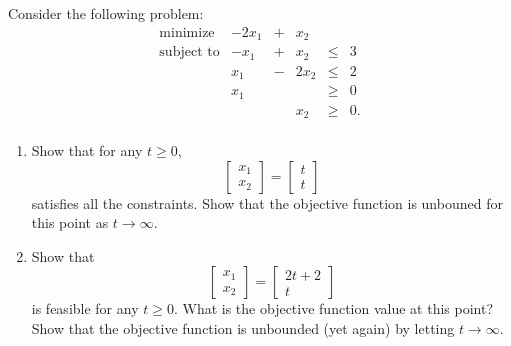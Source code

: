 \begin{ex}{}{} Consider the following problem:
\[
\begin{array}{rrcrll}
\mbox{minimize } & -2x_1 & + & x_2 & \\
\mbox{subject to} & -x_1 & + & x_2 & \leq & 3 \\
& x_1 & - & 2x_2 & \leq & 2 \\
& x_1 & & & \geq & 0 \\
& & & x_2 & \geq & 0. \\
\end{array}
\]

\begin{enumerate}
\item Show that for any \(t \geq 0\),
\[
\begin{bmatrix} x_1 \\ x_2 \end{bmatrix} = \begin{bmatrix} t \\ t \end{bmatrix}
\]
satisfies all the constraints. Show that the objective function is unbouned for this point as $t \to \infty$.

\item Show that \[
\begin{bmatrix} x_1 \\ x_2 \end{bmatrix} = \begin{bmatrix} 2t+2 \\ t \end{bmatrix}
\]
 is feasible for any \(t \geq 0\).  What is the objective function value at this point?  Show that the objective function is unbounded (yet again) by letting $t \to \infty$.
 \end{enumerate}
 \end{ex}
 
